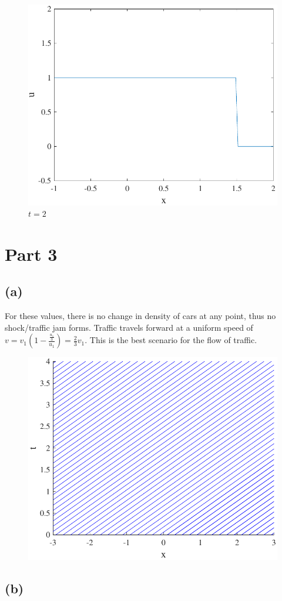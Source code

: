 \documentclass{article}
\begin{document}
\begin{figure}[!htbp]
  \centering
    \includegraphics[width=.49\textwidth]{hw_14_plot13.pdf}
    \caption{$t = 2$}
\end{figure}
\section*{Part 3}
\subsection*{(a)}
For these values, there is no change in density of cars at any point, thus no shock/traffic jam forms. Traffic travels forward at a uniform speed of $v = v_1(1 - \frac{\frac{u_1}{3}}{u_1}) = \frac{2}{3}v_1$. This is the best scenario for the flow of traffic. 
\begin{figure}[!htbp]
  \centering
    \includegraphics[width=.49\textwidth]{hw_14_plot14.pdf}
    \caption{}
\end{figure}
\subsection*{(b)}
\end{document}
